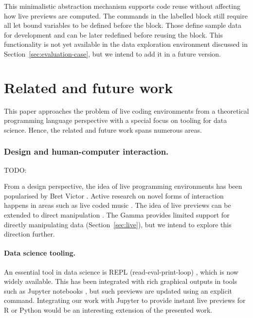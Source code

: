 \documentclass[acmsmall,anonymous,fleqn]{acmart}\settopmatter{printfolios=false,printccs=false,printacmref=false}
\theoremstyle{plain}
\theoremstyle{definition}
\begin{document}
This minimalistic abstraction mechanism supports code reuse without affecting how live previews
are computed. The commands in the labelled block still require all let bound variables to be
defined before the block. Those define sample data for development and can be later redefined before
reusing the block. This functionality is not yet available in the data exploration environment
discussed in Section~\ref{sec:evaluation-case}, but we intend to add it in a future version.


\section{Related and future work}
\label{sec:future}

This paper approaches the problem of live coding environments from a theoretical programming
language perspective with a special focus on tooling for data science. Hence, the related and
future work spans numerous areas.

\subsubsection*{Design and human-computer interaction.}
TODO: \citet{principle}

From a design perspective, the idea of live programming environments has been popularised by
Bret Victor \cite{learnable}. Active research on novel forms of interaction happens in areas
such as live coded music \cite{beyond,sonic}.
The idea of live previews can be extended to direct manipulation \cite{direct}. The Gamma
provides limited support for directly manipulating data (Section~\ref{sec:live}), but we
intend to explore this direction further.

\paragraph{Data science tooling.}
An essential tool in data science is REPL (read-eval-print-loop) \cite{drscheme}, which is now
widely available. This has been integrated with rich graphical outputs in tools such as Jupyter
notebooks \cite{jupyter,ipython}, but such previews are updated using an explicit command.
Integrating our work with Jupyter to provide instant live previews for R or Python would be
an interesting extension of the presented work.
\end{document}
